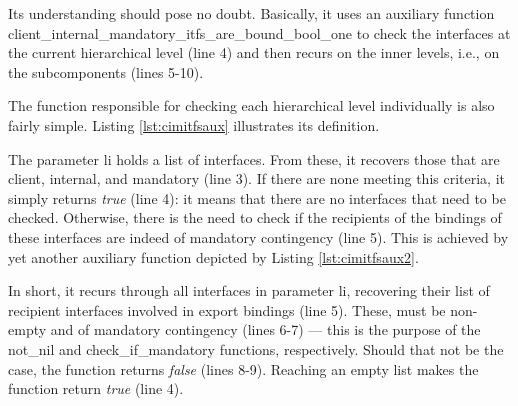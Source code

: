    \noindent %
   Its understanding should pose no doubt. Basically, it uses an auxiliary function
   \textsf{client\_internal\_mandatory\_itfs\_are\_bound\_bool\_one} to check the \textsf{interface}s at the current 
   hierarchical level (line 4) and then recurs on the inner levels, i.e., on the 
   sub\textsf{component}s (lines 5-10).
   
	The function responsible for checking each hierarchical level individually is also fairly simple. Listing
	\ref{lst:cimitfsaux} illustrates its definition.

	


	\noindent  The parameter \textsf{li} holds a list of \textsf{interface}s. From these, it recovers those
	that are \textsf{client}, \textsf{internal}, and \textsf{mandatory} (line 3). If there are none meeting
	this criteria,  it simply returns \textit{true} (line 4): it means that there are no \textsf{interface}s that need
	to be checked. Otherwise, there is the need to check if the recipients of the \textsf{binding}s of these \textsf{interface}s are indeed
	of \textsf{mandatory} contingency (line 5). This is achieved by yet another auxiliary function depicted by
	Listing \ref{lst:cimitfsaux2}.
	
	

	\noindent In short, it recurs through all \textsf{interface}s in parameter \textsf{li}, recovering
	their list of recipient \textsf{interface}s involved in \textsf{export} \textsf{binding}s (line 5). 
	These, must be non-empty and of \textsf{mandatory} \textsf{contingency} (lines 6-7) ---
	this is the purpose of the \textsf{not\_nil} and \textsf{check\_if\_mandatory} functions, respectively.
	Should that
	not be the case, the function returns \textit{false} (lines 8-9). Reaching an empty list makes the function
	return \textit{true} (line 4).
				
